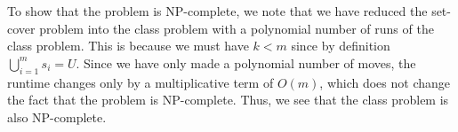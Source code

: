 \documentclass[psamsfonts]{amsart}
\newenvironment{sol}{{\bfseries Solution}}{\qedsymbol}
\theoremstyle{definition}
\theoremstyle{remark}
\numberwithin{equation}{section}
\begin{document}
\begin{sol}
To show that the problem is NP-complete, we note that we have reduced the set-cover problem into the class problem with a polynomial number of runs of the class problem. This is because we must have $k < m$ since by definition $\bigcup_{i=1}^m s_i = U$. Since we have only made a polynomial number of moves, the runtime changes only by a multiplicative term of $O(m)$, which does not change the fact that the problem is NP-complete. Thus, we see that the class problem is also NP-complete. 
\end{sol}
\end{document}

